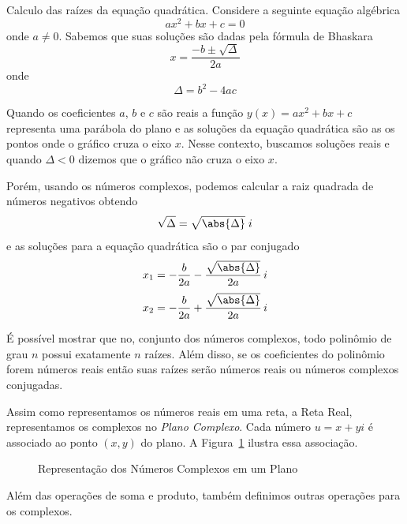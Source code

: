 \begin{example}
  Calculo das raízes da equação quadrática.
  \solution
  Considere a seguinte equação algébrica
  \[ ax^2 + bx + c = 0 \]
  onde $a\neq 0$. Sabemos que suas soluções são dadas pela fórmula de Bhaskara
  \[ x = \frac{-b \pm \sqrt{\Delta}}{2a} \]
  onde
  \[ \Delta = b^2 - 4 ac \]

  Quando os coeficientes $a$, $b$ e $c$ são reais
  a função \(y(x) = ax^2 + bx + c \)
  representa uma parábola do plano e as soluções da equação quadrática são as os pontos onde o gráfico
  cruza o eixo $x$. Nesse contexto, buscamos soluções reais e quando \(\Delta<0\) dizemos que o
  gráfico não cruza o eixo $x$.

  Porém, usando os números complexos, podemos calcular a raiz quadrada de números negativos obtendo
  \[ \sqrt{\Delta} = \sqrt{\abs{\Delta}}\;i \]
  e as soluções para a equação quadrática são o par conjugado
  \[ x_1 = -\frac{b}{2a} - \frac{\sqrt{\abs{\Delta}}}{2a}\,i \]
  \[ x_2 = -\frac{b}{2a} + \frac{\sqrt{\abs{\Delta}}}{2a}\,i \]

  É possível mostrar que no, conjunto dos números complexos,
  todo polinômio de grau $n$ possui exatamente $n$ raízes.
  Além disso, se os coeficientes do polinômio forem números reais
  então suas raízes serão números reais ou números complexos conjugadas.
\end{example}

Assim como representamos os números reais em uma reta, a Reta Real, representamos
os complexos no \emph{Plano Complexo}. Cada número $u=x+yi$ é associado ao ponto
$(x, y)$ do plano. A Figura~\ref{fig:PlanoComplexo} ilustra essa associação.

\begin{figure}
  \centering
  
  \caption{Representação dos Números Complexos em um Plano}
  \label{fig:PlanoComplexo}
\end{figure}

Além das operações de soma e produto, também definimos outras operações
para os complexos.

